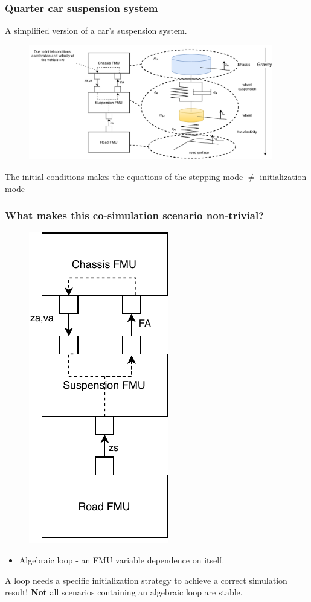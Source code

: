 \documentclass{beamer}
\begin{document}
\begin{frame}
\frametitle{Quarter car suspension system}
A simplified version of a car's suspension system.
\begin{figure}
    \centering
    \includegraphics[width=0.95\textwidth]{images/quarter_car_FMUs.pdf}
    \label{fig:SCC_quarter}
\end{figure}
The initial conditions makes the equations of the stepping mode $\neq$ initialization mode
\end{frame}

\begin{frame}
\frametitle{What makes this co-simulation scenario non-trivial?}
\begin{figure}
    \centering
    \includegraphics[scale=0.6]{images/quarter_car-Page-4.pdf}
    \label{fig:SCC_quarter}
\end{figure}
\begin{itemize}
    \item Algebraic loop - an FMU variable dependence on itself.
\end{itemize}
A loop needs a specific initialization strategy to achieve a correct simulation result!
\textbf{Not} all scenarios containing an algebraic loop are stable.
\end{frame}
\end{document}

